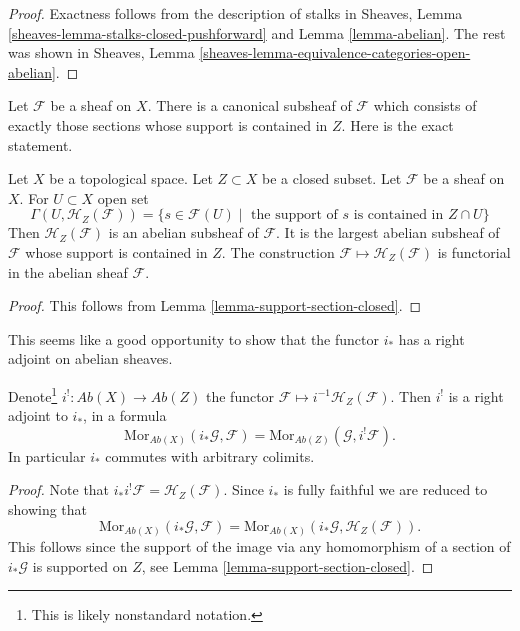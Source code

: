 \begin{proof}
Exactness follows from the description of
stalks in Sheaves, Lemma \ref{sheaves-lemma-stalks-closed-pushforward}
and Lemma \ref{lemma-abelian}. The rest was shown in
Sheaves, Lemma \ref{sheaves-lemma-equivalence-categories-open-abelian}.
\end{proof}

\noindent
Let $\mathcal{F}$ be a sheaf on $X$. There is a canonical subsheaf
of $\mathcal{F}$ which consists of exactly those sections whose
support is contained in $Z$. Here is the exact statement.

\begin{lemma}
\label{lemma-sections-support-in-closed}
Let $X$ be a topological space. Let $Z \subset X$ be a closed subset.
Let $\mathcal{F}$ be a sheaf on $X$. For $U \subset X$ open set
$$
\Gamma(U, \mathcal{H}_Z(\mathcal{F})) =
\{s \in \mathcal{F}(U) \mid
\text{ the support of }s\text{ is contained in }Z \cap U\}
$$
Then $\mathcal{H}_Z(\mathcal{F})$ is an abelian subsheaf of
$\mathcal{F}$. It is the largest abelian subsheaf of
$\mathcal{F}$ whose support is contained in $Z$. The construction
$\mathcal{F} \mapsto \mathcal{H}_Z(\mathcal{F})$ is functorial
in the abelian sheaf $\mathcal{F}$.
\end{lemma}

\begin{proof}
This follows from Lemma \ref{lemma-support-section-closed}.
\end{proof}

\noindent
This seems like a good opportunity to show that the functor
$i_*$ has a right adjoint on abelian sheaves.

\begin{lemma}
\label{lemma-i-star-right-adjoint}
Denote\footnote{This is likely nonstandard notation.}
$i^! : \textit{Ab}(X) \to \textit{Ab}(Z)$ the functor
$\mathcal{F} \mapsto i^{-1}\mathcal{H}_Z(\mathcal{F})$.
Then $i^!$ is a right adjoint to $i_*$, in a formula
$$
\text{Mor}_{\textit{Ab}(X)}(i_*\mathcal{G}, \mathcal{F})
=
\text{Mor}_{\textit{Ab}(Z)}(\mathcal{G}, i^!\mathcal{F}).
$$
In particular $i_*$ commutes with arbitrary colimits.
\end{lemma}

\begin{proof}
Note that $i_*i^!\mathcal{F} = \mathcal{H}_Z(\mathcal{F})$.
Since $i_*$ is fully faithful we are reduced to showing that
$$
\text{Mor}_{\textit{Ab}(X)}(i_*\mathcal{G}, \mathcal{F})
=
\text{Mor}_{\textit{Ab}(X)}(i_*\mathcal{G}, \mathcal{H}_Z(\mathcal{F})).
$$
This follows since the support of the image via any homomorphism
of a section of $i_*\mathcal{G}$ is supported on $Z$, see
Lemma \ref{lemma-support-section-closed}.
\end{proof}

